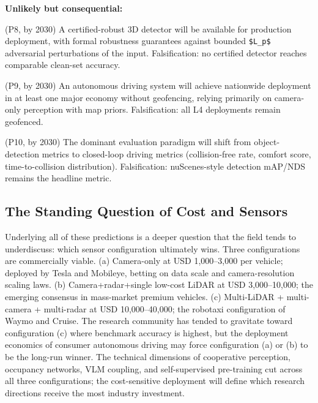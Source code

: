 \textbf{Unlikely but consequential:}

(P8, by 2030) A certified-robust 3D detector will be available for production deployment, with formal robustness guarantees against bounded \texttt{\$L\_p\$} adversarial perturbations of the input. Falsification: no certified detector reaches comparable clean-set accuracy.

(P9, by 2030) An autonomous driving system will achieve nationwide deployment in at least one major economy without geofencing, relying primarily on camera-only perception with map priors. Falsification: all L4 deployments remain geofenced.

(P10, by 2030) The dominant evaluation paradigm will shift from object-detection metrics to closed-loop driving metrics (collision-free rate, comfort score, time-to-collision distribution). Falsification: nuScenes-style detection mAP/NDS remains the headline metric.

\subsection{The Standing Question of Cost and Sensors}\label{the-standing-question-of-cost-and-sensors}

Underlying all of these predictions is a deeper question that the field tends to underdiscuss: which sensor configuration ultimately wins. Three configurations are commercially viable. (a) Camera-only at USD 1,000--3,000 per vehicle; deployed by Tesla and Mobileye, betting on data scale and camera-resolution scaling laws. (b) Camera+radar+single low-cost LiDAR at USD 3,000--10,000; the emerging consensus in mass-market premium vehicles. (c) Multi-LiDAR + multi-camera + multi-radar at USD 10,000--40,000; the robotaxi configuration of Waymo and Cruise. The research community has tended to gravitate toward configuration (c) where benchmark accuracy is highest, but the deployment economics of consumer autonomous driving may force configuration (a) or (b) to be the long-run winner. The technical dimensions of cooperative perception, occupancy networks, VLM coupling, and self-supervised pre-training cut across all three configurations; the cost-sensitive deployment will define which research directions receive the most industry investment.

